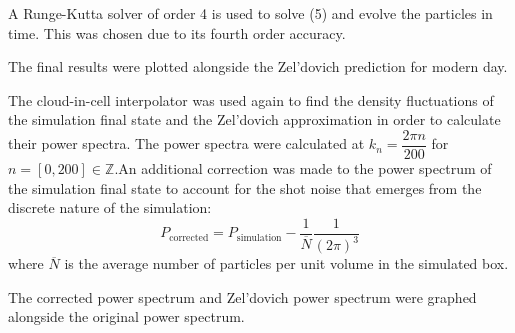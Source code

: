 \documentclass[12pt]{article}   	%
\begin{document}
A Runge-Kutta solver of order 4 is used to solve (5) and evolve the particles in time. This was chosen
due to its fourth order accuracy.

The final results were plotted alongside the Zel'dovich prediction for modern day.

The cloud-in-cell interpolator was used again to find the density fluctuations of the simulation final state 
and the Zel'dovich approximation in order to calculate their power spectra. The power spectra were 
calculated at $k_n = \dfrac{2\pi n}{200}$ for $n = [0,200]\in\mathbb{Z}$.An additional correction
was made to the power spectrum of the simulation final state to account for the shot noise that emerges
from the discrete nature of the simulation:
\[
	P_{\text{corrected}} = P_{\text{simulation}} - \frac{1}{\overline N}\frac{1}{(2\pi)^3}
\]
where $\overline N$ is the average number of particles per unit volume in the simulated box.

The corrected power spectrum and Zel'dovich power spectrum were graphed alongside the original 
power spectrum.
\clearpage
\end{document}
